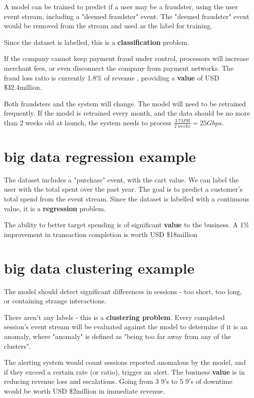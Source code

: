 \documentclass[11pt]{article}
\begin{document}
 A model can be trained to predict if a user may be a fraudster, using the user event stream, including a "deemed fraudster" event. The "deemed fraudster" event would be removed from the stream and used as the label for training.

Since the dataset is labelled, this is a \textbf{classification} problem.

If the company cannot keep payment fraud under control, processors will increase merchant fees, or even disconnect the company from payment networks. The fraud loss ratio is currently 1.8\% of revenue \cite{ccfraud}, providing a \textbf{value} of USD \$32.4million.

Both fraudsters and the system will change. The model will need to be retrained frequently. If the model is retrained every month, and the data should be no more than 2 weeks old at launch, the system needs to process \(\frac{3.73PB}{2\ weeks} = 25Gbps\).

\section*{big data regression example}

The dataset includes a "purchase" event, with the cart value. We can label the user with the total spent over the past year. The goal is to predict a customer's total spend from the event stream. Since the dataset is labelled with a continuous value, it is a \textbf{regression} problem.

The ability to better target spending is of significant \textbf{value} to the business. A 1\% improvement in transaction completion is worth USD \$18million

\section*{big data clustering example}

The model should detect significant differences in sessions - too short, too long, or containing strange interactions.

There aren't any labels - this is a \textbf{clustering problem}. Every completed session's event stream will be evaluated against the model to determine if it is an anomaly, where "anomaly" is defined as "being too far away from any of the clusters".

The alerting system would count sessions reported anomalous by the model, and if they exceed a certain rate (or ratio), trigger an alert. The business \textbf{value} is in reducing revenue loss and escalations. Going from 3 9's to 5 9's of downtime would be worth USD \$2million in immediate revenue.
\end{document}
